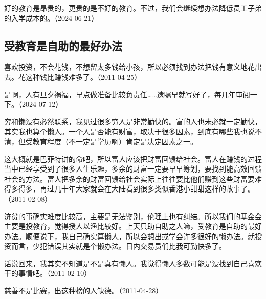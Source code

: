 
好的教育是昂贵的，更贵的是不好的教育。不过，我们会继续想办法降低员工子弟的入学成本的。（2024-06-21）

\subsection{受教育是自助的最好办法}


喜欢投资，不会花钱，不想留太多钱给小孩，所以必须找到办法把钱有意义地花出去。花这种钱比赚钱难多了。（2011-04-25）


是啊，人有旦夕祸福，早点做准备比较负责任……遗嘱早就写好了，每几年审阅一下。（2024-07-12）


穷和懒没有必然联系，我见过很多穷人是非常勤快的。富的人也未必就一定勤快，其实我也算个懒人。一个人是否能有财富，取决于很多因素，到底有哪些我也说不清，但受教育程度（不一定是学历啊）肯定是决定因素之一。

这大概就是巴菲特讲的命吧，所以富人应该把财富回馈给社会。富人在赚钱的过程当中已经享受到了很多人生乐趣，多余的财富一定要早早筹划，要找到能高效回馈社会的方法。富人把多余的财富回馈给社会实际上往往要比他们赚到这些财富要难得多得多，再过几十年大家就会在大陆看到很多类似香港小甜甜这样的故事了。（2011-02-08）

济贫的事确实难度比较高，主要是无法鉴别，伦理上也有纠结。所以我们的基金会主要是投教育，觉得授人以渔比较好。上天只助自助之人嘛，受教育是自助的最好办法。顺便说下，我自己确实算懒人，所以会想出或学会许多很好的懒办法。就投资而言，少犯错误其实就是个懒办法。日内交易员们比我可勤快多了。

话说回来，我其实不知道是不是真有懒人。我觉得懒人多数可能是没找到自己喜欢干的事情吧。（2011-02-10）


慈善不是比赛，出这种榜的人缺德。（2011-04-28）


